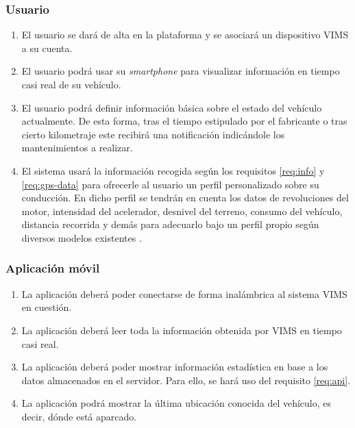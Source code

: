 \subsubsection{Usuario}
\begin{enumerate}[resume, label=\textbf{\texttt{RF-\arabic*}}]
  \item\label{req:register} El usuario se dará de alta en la plataforma y se
        asociará un dispositivo \ac{VIMS} a su cuenta.
  \item\label{req:rt} El usuario podrá usar su \textit{smartphone} para visualizar
        información en tiempo casi real de su vehículo.
  \item\label{req:maintenance} El usuario podrá definir información básica 
        sobre el estado del vehículo actualmente. De esta forma, tras el tiempo
        estipulado por el fabricante o tras cierto kilometraje este recibirá una
        notificación indicándole los mantenimientos a realizar.
  \item\label{req:driving} El sistema usará la información recogida según los
        requisitos \ref{req:info} y \ref{req:gps-data} para ofrecerle al usuario
        un perfil personalizado sobre su conducción. En dicho perfil se tendrán
        en cuenta los datos de revoluciones del motor, intensidad del acelerador,
        desnivel del terreno, consumo del vehículo, distancia recorrida y demás
        para adecuarlo bajo un perfil propio según diversos modelos existentes \cite{husseinaliameenDrivingBehaviourIdentification2021}.
\end{enumerate}

\subsubsection{Aplicación móvil}
\begin{enumerate}[resume, label=\textbf{\texttt{RF-\arabic*}}]
  \item\label{req:app-functions} La aplicación deberá poder conectarse de forma
        inalámbrica al sistema \ac{VIMS} en cuestión.
  \item\label{req:app-sampling} La aplicación deberá leer toda la información
        obtenida por \ac{VIMS} en tiempo casi real.
  \item\label{req:app-stats} La aplicación deberá poder mostrar información
        estadística en base a los datos almacenados en el servidor. Para ello,
        se hará uso del requisito \ref{req:api}.
  \item\label{req:location} La aplicación podrá mostrar la última ubicación
        conocida del vehículo, es decir, dónde está aparcado.
\end{enumerate}
